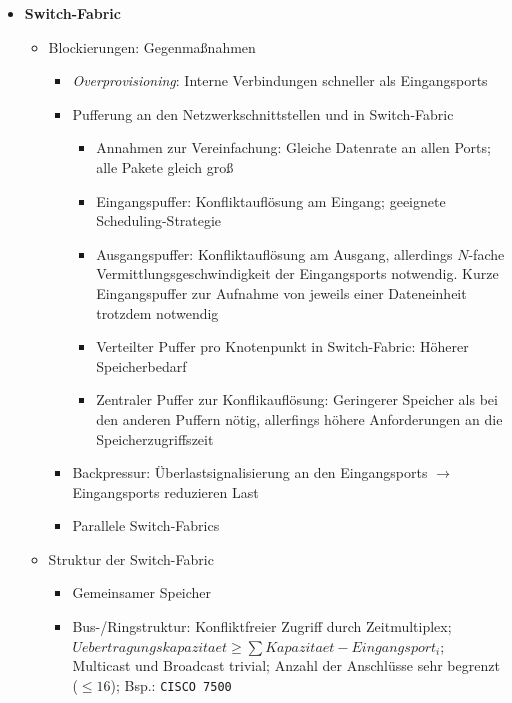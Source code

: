 \begin{itemize}
\begin{itemize}
\begin{figure}[!h]
		\end{figure}
	\end{itemize}
	\item \textbf{Switch-Fabric}
	\begin{itemize}
		\item Blockierungen: Gegenmaßnahmen
		\begin{itemize}
			\item \textit{Overprovisioning}: Interne Verbindungen schneller als Eingangsports
			\item Pufferung an den Netzwerkschnittstellen und in Switch-Fabric
			\begin{itemize}
				\item Annahmen zur Vereinfachung: Gleiche Datenrate an allen Ports; alle Pakete gleich groß
				\item Eingangspuffer: Konfliktauflösung am Eingang; geeignete Scheduling-Strategie
				\item Ausgangspuffer: Konfliktauflösung am Ausgang, allerdings \(N\)-fache Vermittlungsgeschwindigkeit der Eingangsports notwendig. Kurze Eingangspuffer zur Aufnahme von jeweils einer Dateneinheit trotzdem notwendig
				\item Verteilter Puffer pro Knotenpunkt in Switch-Fabric: Höherer Speicherbedarf
				\item Zentraler Puffer zur Konflikauflösung: Geringerer Speicher als bei den anderen Puffern nötig, allerfings höhere Anforderungen an die Speicherzugriffszeit 
			\end{itemize}
			\item Backpressur: Überlastsignalisierung an den Eingangsports \(\rightarrow\) Eingangsports reduzieren Last
			\item Parallele Switch-Fabrics
		\end{itemize}
		\item Struktur der Switch-Fabric
		\begin{itemize}
			\item Gemeinsamer Speicher
			\item Bus-/Ringstruktur: Konfliktfreier Zugriff durch Zeitmultiplex; \(Uebertragungskapazitaet \ge \sum Kapazitaet-Eingangsport_i\); Multicast und Broadcast trivial; Anzahl der Anschlüsse sehr begrenzt (\(\le 16\)); Bsp.: \texttt{CISCO 7500}

\end{itemize}
\end{itemize}
\end{itemize}
